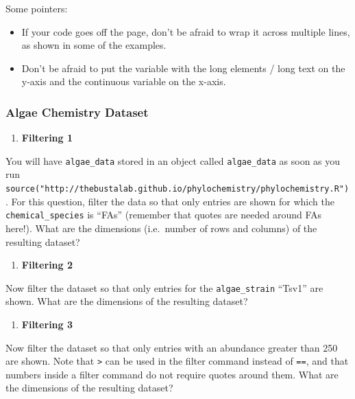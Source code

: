 \documentclass[
]{krantz}
\providecommand{\tightlist}{%
  \setlength{\itemsep}{0pt}\setlength{\parskip}{0pt}}
\begin{document}
Some pointers:

\begin{itemize}
\item
  If your code goes off the page, don't be afraid to wrap it across multiple lines, as shown in some of the examples.
\item
  Don't be afraid to put the variable with the long elements / long text on the y-axis and the continuous variable on the x-axis.
\end{itemize}

\hypertarget{algae-chemistry-dataset}{%
\subsubsection{Algae Chemistry Dataset}\label{algae-chemistry-dataset}}

\begin{enumerate}
\def\labelenumi{\arabic{enumi}.}
\tightlist
\item
  \textbf{Filtering 1}
\end{enumerate}

You will have \texttt{algae\_data} stored in an object called \texttt{algae\_data} as soon as you run \texttt{source("http://thebustalab.github.io/phylochemistry/phylochemistry.R")}. For this question, filter the data so that only entries are shown for which the \texttt{chemical\_species} is ``FAs'' (remember that quotes are needed around FAs here!). What are the dimensions (i.e.~number of rows and columns) of the resulting dataset?

\begin{enumerate}
\def\labelenumi{\arabic{enumi}.}
\setcounter{enumi}{1}
\tightlist
\item
  \textbf{Filtering 2}
\end{enumerate}

Now filter the dataset so that only entries for the \texttt{algae\_strain} ``Tsv1'' are shown. What are the dimensions of the resulting dataset?

\begin{enumerate}
\def\labelenumi{\arabic{enumi}.}
\setcounter{enumi}{2}
\tightlist
\item
  \textbf{Filtering 3}
\end{enumerate}

Now filter the dataset so that only entries with an abundance greater than 250 are shown. Note that \texttt{\textgreater{}} can be used in the filter command instead of \texttt{==}, and that numbers inside a filter command do not require quotes around them. What are the dimensions of the resulting dataset?
\end{document}
